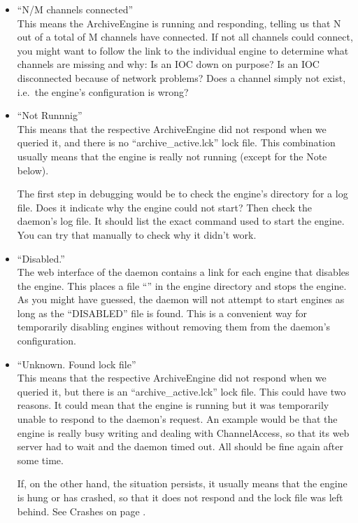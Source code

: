 \begin{itemize}
\item ``N/M channels connected''\\
      This means the ArchiveEngine is running and responding,
      telling us that N out of a total of M channels have connected.
      If not all channels could connect, you might want to follow
      the link to the individual engine to determine what channels are
      missing and why: Is an IOC down on purpose? Is an IOC
      disconnected because of network problems? Does a channel simply
      not exist, i.e.\ the engine's configuration is wrong?
\item ``Not Runnnig''\\
      This means that the respective ArchiveEngine did not respond
      when we queried it, and there is no ``archive\_active.lck'' lock
      file. This combination usually means that the engine is really
      not running (except for the Note below).

      The first step in debugging would be to check the engine's
      directory for a log file. Does it indicate why the engine could
      not start? Then check the daemon's log file. It should list the
      exact command used to start the engine. You can try that
      manually to check why it didn't work.
\item ``Disabled.''\\
      The web interface of the daemon contains a link for each engine
      that disables the engine. This places a file
      ``'' in the engine directory and stops the
      engine.  As you might have guessed, the daemon will not attempt
      to start engines as long as the ``DISABLED'' file is found. This
      is a convenient way for temporarily disabling engines without
      removing them from the daemon's configuration.
\item ``Unknown. Found lock file''\\
      This means that the respective ArchiveEngine did not respond
      when we queried it, but there is an ``archive\_active.lck'' lock
      file. This could have two reasons. It could mean that the engine
      is running but it was temporarily unable to respond to the
      daemon's request. An example would be that the engine is really
      busy writing and dealing with ChannelAccess, so that its web
      server had to wait and the daemon timed out. All should be fine
      again after some time.

      If, on the other hand, the situation persists, it usually means
      that the engine is hung or has crashed, so that it does not
      respond and the lock file was left behind.
      See Crashes on page \pageref{sec:crash}.
\end{itemize}

